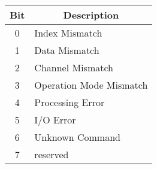 \begin{table}[H]
    \centering
    \begin{tabular}{|c|l|}
        \hline
        \textbf{Bit}   & \multicolumn{1}{|c|}{\textbf{Description}}\\ \hline \hline
        0   &    Index Mismatch   \\ \hline
        1   &    Data Mismatch   \\ \hline
        2   &    Channel Mismatch   \\ \hline
        3   &    Operation Mode Mismatch  \\ \hline
        4   &    Processing Error   \\ \hline
        5   &    I/O Error   \\ \hline
        6   &    Unknown Command   \\ \hline
        7   &    reserved   \\ \hline
    \end{tabular}
\label{tab:CAN-status}
\end{table}


